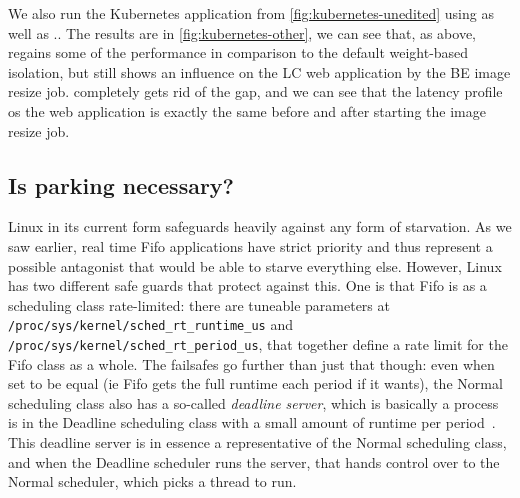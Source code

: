 We also run the Kubernetes application from \autoref{fig:kubernetes-unedited}
using \schedidle{} as well as \schedbe{}.. The results
are in \autoref{fig:kubernetes-other}, we can see that, as above, \schedidle{}
regains some of the performance in comparison to the default weight-based
isolation, but still shows an influence on the LC web application by the BE
image resize job. \schedbe{} completely gets rid of the gap, and we can see that
the latency profile os the web application is exactly the same before and after
starting the image resize job.


\subsection{Is parking necessary?}

Linux in its current form safeguards heavily against any form of starvation. As
we saw earlier, real time Fifo applications have strict priority and thus
represent a possible antagonist that would be able to starve everything else.
However, Linux has two different safe guards that protect against this. One is
that Fifo is as a scheduling class rate-limited: there are tuneable parameters
at \texttt{/proc/sys/kernel/sched\_rt\_runtime\_us} and
\texttt{/proc/sys/kernel/sched\_rt\_period\_us}, that together define a rate
limit for the Fifo class as a whole. The failsafes go further than just that
though: even when set to be equal (ie Fifo gets the full runtime each period if
it wants), the Normal scheduling class also has a so-called \textit{deadline
server}, which is basically a process is in the Deadline scheduling class with a
small amount of runtime per period~\cite{lkml-deadline-srv}. This deadline
server is in essence a representative of the Normal scheduling class, and when
the Deadline scheduler runs the server, that hands control over to the Normal
scheduler, which picks a thread to run.


